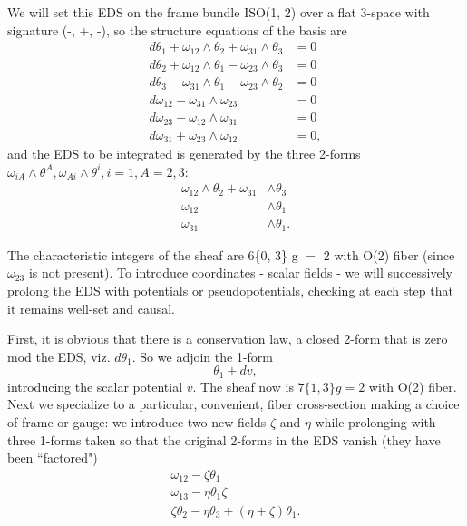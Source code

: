 \documentclass[a4paper,a4paper]{article}
\begin{document}
        We will set this EDS on the frame bundle ISO(1, 2) over a flat
3-space with signature (-, \(+\), -),  so the structure equations of the
basis are
\begin{align}
{d\theta }_{1} + {\omega }_{12} \wedge {\theta }_{2} + {\omega }_{31}
\wedge {\theta }_{3} &= 0  \\
{d\theta }_{2} + {\omega }_{12} \wedge {\theta }_{1} - {\omega }_{23}
\wedge {\theta }_{3} &= 0  \\
{d\theta }_{3} - {\omega }_{31} \wedge {\theta }_{1} - {\omega }_{23}
\wedge {\theta }_{2} &= 0  \\
{d\omega }_{12} - {\omega }_{31} \wedge {\omega }_{23} &= 0  \\
{d\omega }_{23} - {\omega }_{12} \wedge {\omega }_{31} &= 0  \\
{d\omega }_{31} + {\omega }_{23} \wedge {\omega }_{12} &= 0,
\end{align}
and the EDS to be integrated is generated by the three 2-forms ${\omega
}_{iA} \wedge {\theta }^{A},   {\omega }_{Ai} \wedge
{\theta }^{i},   i = 1,   A = 2, 3$:
\begin{align}
{\omega }_{12} \wedge {\theta }_{2} + {\omega }_{31} &\wedge {\theta
}_{3}  \\
{\omega }_{12} &\wedge {\theta }_{1}  \\
{\omega }_{31} &\wedge {\theta }_{1}.
\end{align}

The characteristic integers of the sheaf are 6\{0, 3\} g \(=\) 2 with
O(2) fiber (since ${\omega }_{23}$ is not present). To introduce
coordinates - scalar fields - we will successively prolong the EDS with potentials
or pseudopotentials,  checking at each step that it remains well-set and
causal.

        First,  it is obvious that there is a conservation law,  a
closed 2-form that is zero mod the EDS,  viz. \({{{d\theta }}_1}\). So
we adjoin the 1-form
\begin{equation}
{{\theta }_1}+{dv},
\end{equation}
introducing the scalar potential $v$. The sheaf now is $7\{1, 3\} g = 2$
with O(2) fiber. Next we specialize to a particular,  convenient,  fiber
cross-section making a choice of frame or gauge: we introduce two new fields \(\zeta
\) and  \(\eta \) while prolonging with three 1-forms taken so that the
original 2-forms in the EDS vanish (they have been ``factored")
\begin{align}
{{\omega }_{12}}-\zeta  {{\theta }_1}  \\
{{\omega }_{13}}-\eta  {{\theta }_1}\zeta   \\
\zeta  {{\theta }_2}-\eta  {{\theta }_3}+(\eta +\zeta ){{\theta }_1}.
\end{align}
\end{document}
